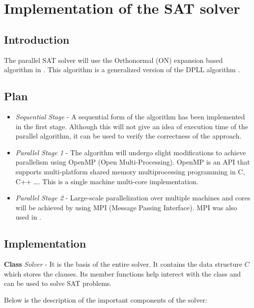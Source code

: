 \chapter{Implementation of the SAT solver}

\section{Introduction}

The parallel SAT solver will use the Orthonormal (ON) expansion based algorithm in \cite{sule14}. This algorithm is a generalized version of the DPLL algorithm \cite{DPLL}.

\section{Plan}
\begin{itemize}
\item \textit{Sequential Stage} - A sequential form of the algorithm has been implemented in the first stage. Although this will not give an idea of execution time of the parallel algorithm, it can be used to verify the correctness of the approach.

\item \textit{Parallel Stage 1} - The algorithm will undergo slight modifications to achieve parallelism using OpenMP (Open Multi-Processing). OpenMP is an API that supports multi-platform shared memory multiprocessing programming in C, C++ \ldots \cite{openmp}. This is a single machine multi-core implementation. 

\item \textit{Parallel Stage 2} - Large-scale parallelization over multiple machines and cores will be achieved by using MPI (Message Passing Interface). MPI was also used in \cite{pmsat}.
\end{itemize}
\section{Implementation}




\textbf{Class} \textit{Solver} - It is the basis of the entire solver. It contains the data structure $C$ which stores the clauses. Its member functions help interect with the class and can be used to solve SAT problems.

Below is the description of the important components of the solver:

